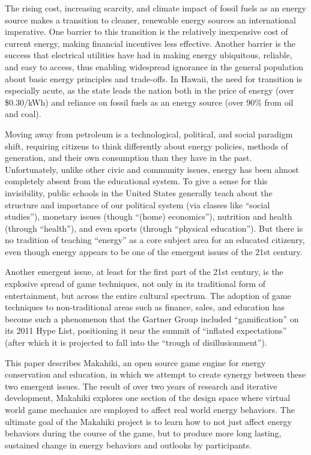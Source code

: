 \documentclass{acm_proc_article-sp}
\begin{document}
The rising cost, increasing scarcity, and climate impact of fossil fuels as
an energy source makes a transition to cleaner, renewable energy sources an
international imperative.  One barrier to this transition is the relatively
inexpensive cost of current energy, making financial incentives less
effective.  Another barrier is the success that electrical utilities have
had in making energy ubiquitous, reliable, and easy to access, thus
enabling widespread ignorance in the general population about basic energy
principles and trade-offs.  In Hawaii, the need for transition is
especially acute, as the state leads the nation both in the price of energy
(over \$0.30/kWh) and reliance on fossil fuels as an energy source (over
90\% from oil and coal).

Moving away from petroleum is a technological, political, and social
paradigm shift, requiring citizens to think differently about energy
policies, methods of generation, and their own consumption than they have
in the past.  Unfortunately, unlike other civic and community issues,
energy has been almost completely absent from the educational system. To
give a sense for this invisibility, public schools in the United States
generally teach about the structure and importance of our political system
(via classes like ``social studies''), monetary issues (though ``(home)
economics''), nutrition and health (through ``health''), and even sports
(through ``physical education'').  But there is no tradition of teaching
``energy'' as a core subject area for an educated citizenry, even though energy
appears to be one of the emergent issues of the 21st century.

Another emergent issue, at least for the first part of the 21st
century, is the explosive spread of game techniques, not only in its
traditional form of entertainment, but across the entire cultural spectrum.
The adoption of game techniques to non-traditional areas such as finance,
sales, and education has become such a phenomenon that the Gartner Group
included ``gamification'' on its 2011 Hype List, positioning it near the
summit of ``inflated expectations'' (after which it is projected to fall
into the ``trough of disillusionment''). 

This paper describes Makahiki, an open source game engine for energy
conservation and education, in which we attempt to create synergy between
these two emergent issues.  The result of over two years of research and
iterative development, Makahiki explores one section of the design space
where virtual world game mechanics are employed to affect real world energy
behaviors.  The ultimate goal of the Makahiki project is to learn how to
not just affect energy behaviors during the course of the game, but to
produce more long lasting, sustained change in energy behaviors and
outlooks by participants. 
\end{document}
